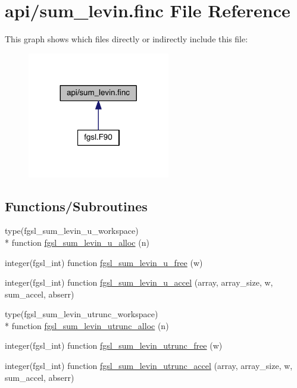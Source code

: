 \hypertarget{sum__levin_8finc}{\section{api/sum\-\_\-levin.finc File Reference}
\label{sum__levin_8finc}
}
This graph shows which files directly or indirectly include this file\-:\nopagebreak
\begin{figure}[H]
\begin{center}
\leavevmode
\includegraphics[width=176pt]{sum__levin_8finc__dep__incl}
\end{center}
\end{figure}
\subsection*{Functions/\-Subroutines}
\begin{DoxyCompactItemize}
\item 
type(fgsl\-\_\-sum\-\_\-levin\-\_\-u\-\_\-workspace) \\*
function \hyperlink{sum__levin_8finc_ad6ebf8afa62ed4d6df0ccc045becc409}{fgsl\-\_\-sum\-\_\-levin\-\_\-u\-\_\-alloc} (n)
\item 
integer(fgsl\-\_\-int) function \hyperlink{sum__levin_8finc_aaf7b37dc4577512c18cb3973ad84252e}{fgsl\-\_\-sum\-\_\-levin\-\_\-u\-\_\-free} (w)
\item 
integer(fgsl\-\_\-int) function \hyperlink{sum__levin_8finc_ae945413c5c10344d97cc10002dd760c2}{fgsl\-\_\-sum\-\_\-levin\-\_\-u\-\_\-accel} (array, array\-\_\-size, w, sum\-\_\-accel, abserr)
\item 
type(fgsl\-\_\-sum\-\_\-levin\-\_\-utrunc\-\_\-workspace) \\*
function \hyperlink{sum__levin_8finc_a877def7077d13d9c9f6940266bc44a54}{fgsl\-\_\-sum\-\_\-levin\-\_\-utrunc\-\_\-alloc} (n)
\item 
integer(fgsl\-\_\-int) function \hyperlink{sum__levin_8finc_a4703b473d5be9896645002d25bff9467}{fgsl\-\_\-sum\-\_\-levin\-\_\-utrunc\-\_\-free} (w)
\item 
integer(fgsl\-\_\-int) function \hyperlink{sum__levin_8finc_aafbf5e22d1e3d84b254f5b0800c4c3bf}{fgsl\-\_\-sum\-\_\-levin\-\_\-utrunc\-\_\-accel} (array, array\-\_\-size, w, sum\-\_\-accel, abserr)
\end{DoxyCompactItemize}


